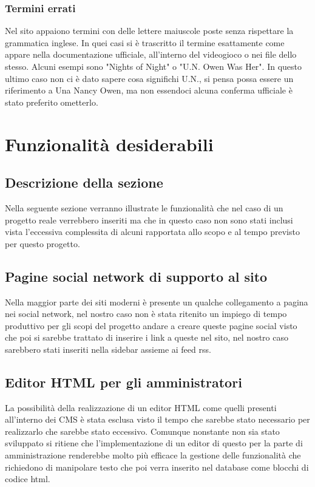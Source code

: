 \documentclass[openany, a4paper, 12pt]{report}
\begin{document}
			\subsection{Termini errati}
				Nel sito appaiono termini con delle lettere maiuscole poste senza rispettare la grammatica inglese. In quei casi si è trascritto il termine esattamente come appare nella documentazione ufficiale, all'interno del videogioco o nei file dello stesso. Alcuni esempi sono "Nights of Night" o "U.N. Owen Was Her". In questo ultimo caso non ci è dato sapere cosa significhi U.N., si pensa possa essere un riferimento a Una Nancy Owen, ma non essendoci alcuna conferma ufficiale è stato preferito ometterlo.\\

	\chapter{Funzionalit\`{a} desiderabili}
		\section{Descrizione della sezione}
		Nella seguente sezione verranno illustrate le funzionalità che nel caso di un progetto reale verrebbero inseriti ma che in questo caso non sono stati inclusi vista l'eccessiva complessita di alcuni rapportata allo scopo e al tempo previsto per questo progetto.

		\section{Pagine social network di supporto al sito}
		Nella maggior parte dei siti moderni è presente un qualche collegamento a pagina nei social network, nel nostro caso non è stata ritenito un impiego di tempo produttivo per gli scopi del progetto andare a creare queste pagine social visto che poi si sarebbe trattato di inserire i link a queste nel sito, nel nostro caso sarebbero stati inseriti nella sidebar assieme ai feed rss.

		\section{Editor HTML per gli amministratori}
		La possibilità della realizzazione di un editor HTML come quelli presenti all'interno dei CMS è stata esclusa visto il tempo che sarebbe stato necessario per realizzarlo che sarebbe stato eccessivo. Comunque nonstante non sia stato sviluppato si ritiene che l'implementazione di un editor di questo per la parte di amministrazione renderebbe molto più efficace la gestione delle funzionalità che richiedono di manipolare testo che poi verra inserito nel database come blocchi di codice html.   
		
\end{document}
